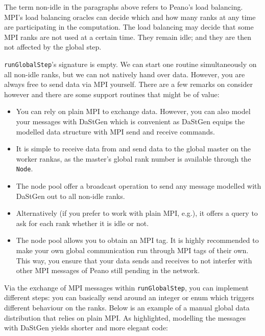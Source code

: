 The term non-idle in the paragraphs above refers to Peano's load balancing.
MPI's load balancing oracles can decide which and how many ranks at any time are
participating in the computation.
The load balancing may decide that some MPI ranks are not used at a certain
time.
They remain idle;
and they are then not affected by the global step.


\texttt{runGlobalStep}'s signature is empty.
We can start one routine simultaneously on all non-idle ranks, but we can not
natively hand over data.
However, you are always free to send data via MPI yourself. 
There are a few remarks on consider however and there are some support routines
that might be of value:

\begin{itemize}
  \item You can rely on plain MPI to exchange data. However, you can also model
  your messages with DaStGen which is convenient as DaStGen equips the modelled
  data structure with MPI send and receive commands.
  \item It is simple to receive data from and send data to the global master on
  the worker rankas, as the master's global rank number is available through the
  \texttt{Node}.
  \item The node pool offer a broadcast operation to send any message modelled
  with DaStGen out to all non-idle ranks.
  \item Alternatively (if you prefer to work with plain MPI, e.g.), it offers a
  query to ask for each rank whether it is idle or not.
  \item The node pool allows you to obtain an MPI tag. It is highly recommended
  to make your own global communication run through MPI tags of their own. This
  way, you ensure that your data sends and receives to not interfer with other
  MPI messages of Peano still pending in the network.
\end{itemize}

\noindent
Via the exchange of MPI messages within \texttt{runGlobalStep}, you can
implement different steps: you can basically send around an integer or enum
which triggers different behaviour on the ranks.
Below is an example of a manual global data distribution that relies on plain
MPI. 
As highlighted, modelling the messages with DaStGen yields shorter and more
elegant code:

